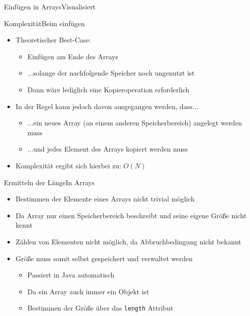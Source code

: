 \begin{frame}{Einfügen in Arrays}{Visualisiert}
\end{frame}

\begin{frame}{Komplexität}{Beim einfügen}
	\begin{itemize}
		\item Theoretischer Best-Case:
		\begin{itemize}
			\item Einfügen am Ende des Arrays
			\item ...solange der nachfolgende Speicher noch ungenutzt ist
			\item Dann wäre lediglich eine Kopieroperation erforderlich
		\end{itemize}
		\item In der Regel kann jedoch davon ausgegangen werden, dass...
		\begin{itemize}
			\item ...ein neues Array (an einem anderen Speicherbereich) angelegt werden muss
			\item ...und jedes Element des Arrays kopiert werden muss
		\end{itemize}
		\item Komplexität ergibt sich hierbei zu: $O(N)$
	\end{itemize}
\end{frame}

\begin{frame}{Ermitteln der Länge}{In Arrays}
	\begin{itemize}
		\item Bestimmen der Elemente eines Arrays nicht trivial möglich
		\item Da Array nur einen Speicherbereich beschreibt und seine eigene Größe nicht kennt
		\item Zählen von Elementen nicht möglich, da Abbruchbedingung nicht bekannt
		\item Größe muss somit selbst gespeichert und verwaltet werden
		\begin{itemize}
			\item Passiert in Java automatisch
			\item Da ein Array auch immer ein Objekt ist
			\item Bestimmen der Größe über das \texttt{length} Attribut
		\end{itemize}
	\end{itemize}
\end{frame}

